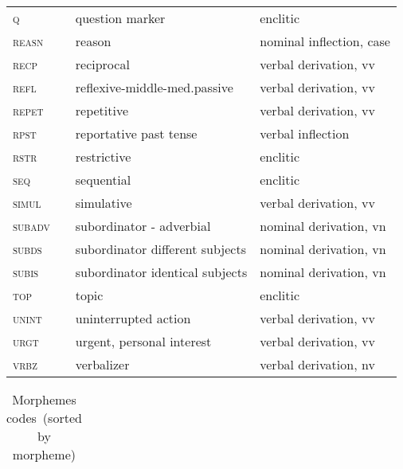 \begin{refsection}
\begin{small}
\begin{longtable}{*{4}{@{\hspace{1ex}}l}@{\hspace{1ex}}}
\textsc{q} 		&  	& question marker 			& enclitic\\
\textsc{reasn} 	&  	& reason 				& nominal inflection, case\\
\textsc{recp} 		&  	& reciprocal 				& verbal derivation, vv\\
\textsc{refl} 		&  		& reflexive-middle-med.passive 		& verbal derivation, vv\\
\textsc{repet}		&  	& repetitive 				& verbal derivation, vv\\
\textsc{rpst} 		&  	& reportative past tense 		& verbal inflection\\
\textsc{rstr} 		&  		& restrictive 				& enclitic\\
\textsc{seq} 		&  		& sequential 				& enclitic\\
\textsc{simul} 		&  	& simulative 				& verbal derivation, vv\\
\textsc{subadv} 	&  	& subordinator - adverbial 		& nominal derivation, vn\\
\textsc{subds} 		&  		& subordinator different subjects 	& nominal derivation, vn\\
\textsc{subis} 		&  	& subordinator identical subjects 	& nominal derivation, vn\\
\textsc{top} 		&  		& topic 				& enclitic\\
\textsc{unint} 		&  		& uninterrupted action 			& verbal derivation, vv\\
\textsc{urgt} 		&  		& urgent, personal interest 		& verbal derivation, vv\\
\textsc{vrbz} 		&  	& verbalizer 				& verbal derivation, nv\\
\end{longtable}
\end{small}

\begin{small}
\begin{longtable}{*{4}{@{\hspace{0.75ex}}l}@{\hspace{0ex}}}
\caption{Morphemes codes~(sorted by morpheme)}\label{Tab4}

\\[2ex]
\toprule
\endfirsthead


\end{longtable}
\end{small}
\end{refsection}
